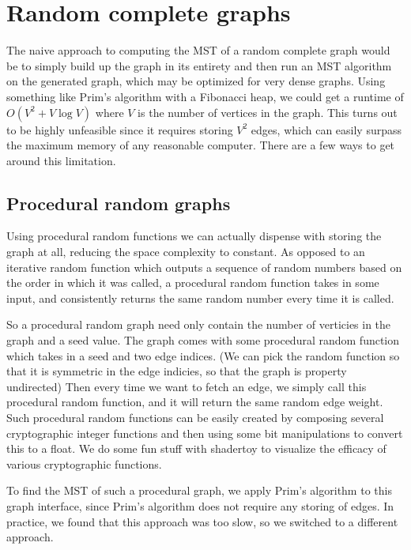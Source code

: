 \documentclass[a4paper, 10pt, twocolumn, twoside]{article}
\begin{document}
\section{Random complete graphs}

The naive approach to computing the MST of a random complete graph would be to simply build up the graph in its entirety and then run an MST algorithm on the generated graph, which may be optimized for very dense graphs. Using something like Prim's algorithm with a Fibonacci heap, we could get a runtime of $O(V^2+V\log V)$ where $V$ is the number of vertices in the graph. This turns out to be highly unfeasible since it requires storing $V^2$ edges, which can easily surpass the maximum memory of any reasonable computer. There are a few ways to get around this limitation.

\subsection{Procedural random graphs}
\label{sec:Preparation}

Using procedural random functions we can actually dispense with storing the graph at all, reducing the space complexity to constant. As opposed to an iterative random function which outputs a sequence of random numbers based on the order in which it was called, a procedural random function takes in some input, and consistently returns the same random number every time it is called. 

So a procedural random graph need only contain the number of verticies in the graph and a seed value. The graph comes with some procedural random function which takes in a seed and two edge indices. (We can pick the random function so that it is symmetric in the edge indicies, so that the graph is property undirected) Then every time we want to fetch an edge, we simply call this procedural random function, and it will return the same random edge weight. Such procedural random functions can be easily created by composing several cryptographic integer functions and then using some bit manipulations to convert this to a float. We do some fun stuff with shadertoy to visualize the efficacy of various cryptographic functions.

To find the MST of such a procedural graph, we apply Prim's algorithm to this graph interface, since Prim's algorithm does not require any storing of edges. In practice, we found that this approach was too slow, so we switched to a different approach.
\end{document}
